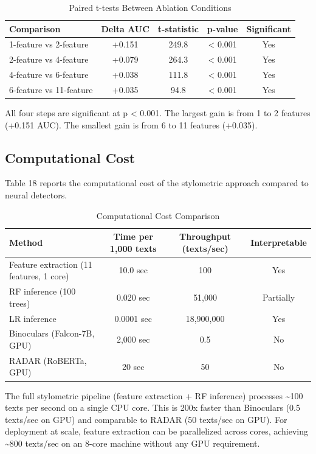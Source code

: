 \documentclass{article}
\begin{document}
{{{{{{\begin{table}[H]
\centering
\small
\begin{tabular}{lcccc}
\toprule
\textbf{Comparison} & \textbf{Delta AUC} & \textbf{t-statistic} & \textbf{p-value} & \textbf{Significant} \\
\midrule
1-feature vs 2-feature & +0.151 & 249.8 & < 0.001 & Yes \\
2-feature vs 4-feature & +0.079 & 264.3 & < 0.001 & Yes \\
4-feature vs 6-feature & +0.038 & 111.8 & < 0.001 & Yes \\
6-feature vs 11-feature & +0.035 & 94.8 & < 0.001 & Yes \\
\bottomrule
\end{tabular}
\caption{Paired t-tests Between Ablation Conditions}
\end{table}

All four steps are significant at p < 0.001. The largest gain is from 1 to 2 features (+0.151 AUC). The smallest gain is from 6 to 11 features (+0.035).

\subsection{Computational Cost}

Table 18 reports the computational cost of the stylometric approach compared to neural detectors.


\begin{table}[H]
\centering
\small
\begin{tabular}{lccc}
\toprule
\textbf{Method} & \textbf{Time per 1,000 texts} & \textbf{Throughput (texts/sec)} & \textbf{Interpretable} \\
\midrule
Feature extraction (11 features, 1 core) & 10.0 sec & 100 & Yes \\
RF inference (100 trees) & 0.020 sec & 51,000 & Partially \\
LR inference & 0.0001 sec & 18,900,000 & Yes \\
Binoculars (Falcon-7B, GPU) & 2,000 sec & 0.5 & No \\
RADAR (RoBERTa, GPU) & 20 sec & 50 & No \\
\bottomrule
\end{tabular}
\caption{Computational Cost Comparison}
\end{table}

The full stylometric pipeline (feature extraction + RF inference) processes \textasciitilde{}100 texts per second on a single CPU core. This is 200x faster than Binoculars (0.5 texts/sec on GPU) and comparable to RADAR (50 texts/sec on GPU). For deployment at scale, feature extraction can be parallelized across cores, achieving \textasciitilde{}800 texts/sec on an 8-core machine without any GPU requirement.

}}}}}}
\end{document}
